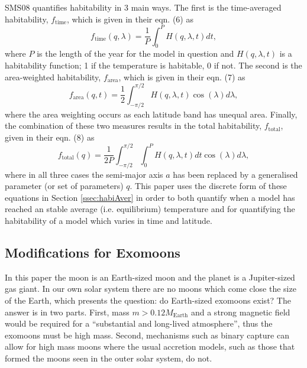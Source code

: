 \documentclass[12pt, onecolumn]{revtex4-2}    %
\begin{document}
SMS08 quantifies habitability in 3 main ways.
The first is the time-averaged habitability, $f_\text{time}$, which is given in their eqn. (6) as
\begin{equation}
  f_\text{time}(q, \lambda) = \frac{1}{P} \int_{0}^{P} H(q, \lambda, t) dt,
  \label{eqn:timeaverage}
\end{equation}
where $P$ is the length of the year for the model in question and $H(q, \lambda, t)$ is a habitability function; 1 if the temperature is habitable, 0 if not.
The second is the area-weighted habitability, $f_\text{area}$, which is given in their eqn. (7) as
\begin{equation}
  f_\text{area}(q, t) = \frac{1}{2} \int_{-\pi/2}^{\pi/2} H(q, \lambda, t) \cos(\lambda)d\lambda,
  \label{eqn:areaaverage}
\end{equation}
where the area weighting occurs as each latitude band has unequal area.
Finally, the combination of these two measures results in the total habitability, $f_\text{total}$, given in their eqn. (8) as
\begin{equation}
  f_\text{total}(q) = \frac{1}{2P} \int_{-\pi/2}^{\pi/2} \int_{0}^{P} H(q, \lambda, t) dt \cos(\lambda)d\lambda,
  \label{eqn:totalaverage}
\end{equation}
where in all three cases the semi-major axis $a$ has been replaced by a generalised parameter (or set of parameters) $q$.
This paper uses the discrete form of these equations in Section \ref{ssec:habiAver} in order to both quantify when a model has reached an stable average (i.e. equilibrium) temperature and for quantifying the habitability of a model which varies in time and latitude.

\subsection{Modifications for Exomoons} \label{ssec:ModificationsForExomoons}
In this paper the moon is an Earth-sized moon and the planet is a Jupiter-sized gas giant.
In our own solar system there are no moons which come close the size of the Earth, which presents the question: do Earth-sized exomoons exist?
The answer is in two parts.
First, mass $m > 0.12 M_\text{Earth}$ and a strong magnetic field \cite{WKW1997} would be required for a ``substantial and long-lived atmosphere'', thus the exomoons must be high mass.
Second, mechanisms such as binary capture \cite{Williams2013} can allow for high mass moons where the usual accretion models, such as those that formed the moons seen in the outer solar system, do not. 
\end{document}

